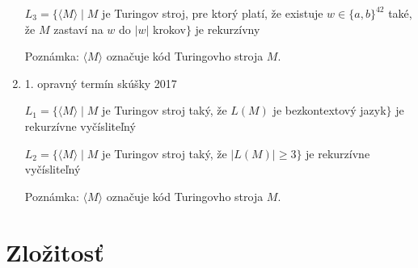 \documentclass[]{article}
\begin{document}
\begin{enumerate}
		$L_3 = \{\langle M \rangle \mid M$ je Turingov stroj, pre ktorý platí, že existuje $w \in \{a,b\}^{42}$ také, že $M$ zastaví na $w$ do $\vert w \vert$ krokov$\}$ je rekurzívny
		
		Poznámka: $\langle M \rangle$ označuje kód Turingovho stroja $M$.
		
		\item 1. opravný termín skúšky 2017
		
		$L_1 = \{\langle M \rangle \mid M$ je Turingov stroj taký, že $L(M)$ je bezkontextový jazyk$\}$ je rekurzívne vyčísliteľný
		
		$L_2 = \{\langle M \rangle \mid M$ je Turingov stroj taký, že $\vert L(M) \vert \geq 3\}$ je rekurzívne vyčísliteľný
		
		Poznámka: $\langle M \rangle$ označuje kód Turingovho stroja $M$.
	\end{enumerate}
	
	\section{Zložitosť}
	
\end{document}

